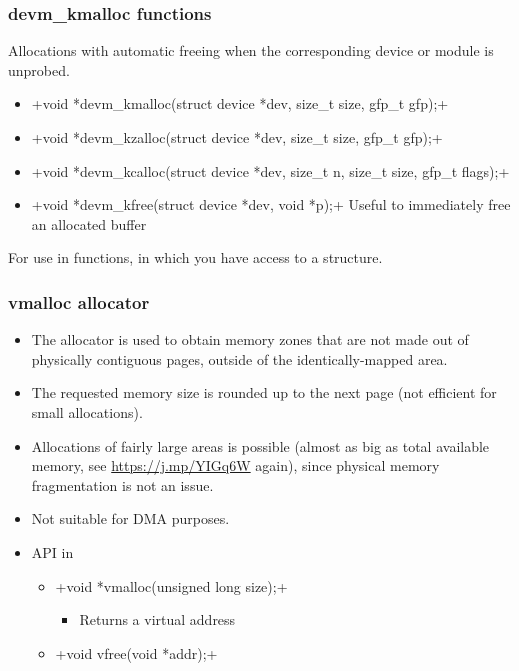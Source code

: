 \begin{frame}
  \frametitle{devm\_kmalloc functions}
  Allocations with automatic freeing when the corresponding device or module is unprobed.
  \begin{itemize}
  \small
  \item {}+void *devm_kmalloc(struct device *dev, size_t size, gfp_t gfp);+
  \item {}+void *devm_kzalloc(struct device *dev, size_t size, gfp_t gfp);+
  \item {}+void *devm_kcalloc(struct device *dev, size_t n, size_t size, gfp_t flags);+
  \item {}+void *devm_kfree(struct device *dev, void *p);+
        Useful to immediately free an allocated buffer
  \end{itemize}
  \normalsize
  For use in  functions, in which you have access to a
   structure.
\end{frame}

\begin{frame}[fragile]
  \frametitle{vmalloc allocator}
  \begin{itemize}
  \item The  allocator is used to obtain memory zones
    that are not made out of physically contiguous pages, outside of
    the identically-mapped area.
  \item The requested memory size is rounded up to the next page (not
    efficient for small allocations).
  \item Allocations of fairly large areas is possible (almost as big
    as total available memory, see \url{https://j.mp/YIGq6W} again),
    since physical memory fragmentation is not an issue.
  \item Not suitable for DMA purposes.
  \item API in 
    \begin{itemize}
    \item {}+void *vmalloc(unsigned long size);+
      \begin{itemize}
      \item Returns a virtual address
      \end{itemize}
    \item {}+void vfree(void *addr);+
    \end{itemize}
  \end{itemize}
\end{frame}

